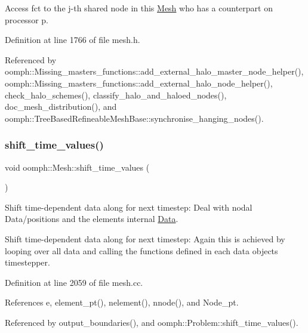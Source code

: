 Access fct to the j-\/th shared node in this \hyperlink{classoomph_1_1Mesh}{Mesh} who has a counterpart on processor p. 



Definition at line 1766 of file mesh.\+h.



Referenced by oomph\+::\+Missing\+\_\+masters\+\_\+functions\+::add\+\_\+external\+\_\+halo\+\_\+master\+\_\+node\+\_\+helper(), oomph\+::\+Missing\+\_\+masters\+\_\+functions\+::add\+\_\+external\+\_\+halo\+\_\+node\+\_\+helper(), check\+\_\+halo\+\_\+schemes(), classify\+\_\+halo\+\_\+and\+\_\+haloed\+\_\+nodes(), doc\+\_\+mesh\+\_\+distribution(), and oomph\+::\+Tree\+Based\+Refineable\+Mesh\+Base\+::synchronise\+\_\+hanging\+\_\+nodes().

\mbox{\label{classoomph_1_1Mesh_a7f097aaa854ac697f8016ba3b7e6c982}} 
\subsubsection{\texorpdfstring{shift\+\_\+time\+\_\+values()}{shift\_time\_values()}}
{\footnotesize\ttfamily void oomph\+::\+Mesh\+::shift\+\_\+time\+\_\+values (\begin{DoxyParamCaption}{ }\end{DoxyParamCaption})}



Shift time-\/dependent data along for next timestep\+: Deal with nodal Data/positions and the element\textquotesingle{}s internal \hyperlink{classoomph_1_1Data}{Data}. 

Shift time-\/dependent data along for next timestep\+: Again this is achieved by looping over all data and calling the functions defined in each data object\textquotesingle{}s timestepper. 

Definition at line 2059 of file mesh.\+cc.



References e, element\+\_\+pt(), nelement(), nnode(), and Node\+\_\+pt.



Referenced by output\+\_\+boundaries(), and oomph\+::\+Problem\+::shift\+\_\+time\+\_\+values().

\mbox{\label{classoomph_1_1Mesh_a5c535dac8f8de9240ecb58058a9cd5ec}} 
